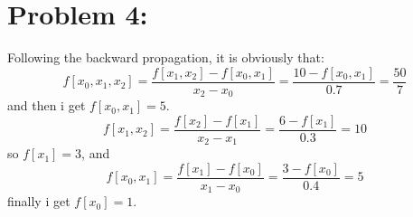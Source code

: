 \documentclass{article}
\begin{document}
\section{Problem 4:} 
Following the backward propagation, it is obviously that: \\
\begin{equation}
    f[x_0,x_1,x_2]=\frac{f[x_1,x_2]-f[x_0,x_1]}{x_2-x_0}=\frac{10-f[x_0,x_1]}{0.7}=\frac{50}{7} \nonumber
\end{equation}
and then i get $f[x_0,x_1]=5$. \\
\begin{equation}
    f[x_1,x_2]=\frac{f[x_2]-f[x_1]}{x_2-x_1}=\frac{6-f[x_1]}{0.3}=10 \nonumber
\end{equation}
so $f[x_1]=3$, and \\
\begin{equation}
    f[x_0,x_1]=\frac{f[x_1]-f[x_0]}{x_1-x_0}=\frac{3-f[x_0]}{0.4}=5 \nonumber
\end{equation}
finally i get $f[x_0]=1$. \\
\end{document}

